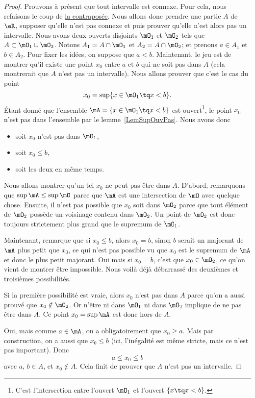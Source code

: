 \begin{proof}
    Prouvons à présent que tout intervalle est connexe. Pour cela, nous refaisons le coup de \href{http://fr.wikipedia.org/wiki/Contraposée}{la contraposée}. Nous allons donc prendre une partie $A$ de $\eR$, supposer qu'elle n'est pas connexe et puis prouver qu'elle n'est alors pas un intervalle. Nous avons deux ouverts disjoints $\mO_1$ et $\mO_2$ tels que $A\subset \mO_1\cup \mO_2$. Notons \( A_1 = A \cap \mO_1 \) et  \( A_2 = A \cap \mO_2 \); et prenons $a\in A_1$ et $b\in A_2$. Pour fixer les idées, on suppose que $a<b$. Maintenant, le jeu est de montrer qu'il existe une point $x_0$ entre $a$ et $b$ qui ne soit pas dans $A$ (cela montrerait que $A$ n'est pas un intervalle). Nous allons prouver que c'est le cas du point
    \[
      x_0=\sup\{ x\in\mO_1\tq x<b \}.
    \]
    Étant donné que l'ensemble $\mA=\{ x\in\mO_1\tq x<b \}$ est ouvert\footnote{C'est l'intersection entre l'ouvert $\mO_1$ et l'ouvert $\{x\tq x<b \}$.}, le point $x_0$ n'est pas dans l'ensemble par le lemme~\ref{LemSupOuvPas}. Nous avons donc
    \begin{itemize}
        \item soit $x_0$ n'est pas dans $\mO_1$,
        \item soit $x_0\leq b$,
        \item soit les deux en même temps.
    \end{itemize}
    Nous allons montrer qu'un tel $x_0$ ne peut pas être dans $A$. D'abord, remarquons que $\sup\mA\leq\sup\mO$ parce que $\mA$ est une intersection de $\mO$ avec quelque chose. Ensuite, il n'est pas possible que $x_0$ soit dans $\mO_2$ parce que tout élément de $\mO_2$ possède un voisinage contenu dans $\mO_2$. Un point de $\mO_2$ est donc toujours strictement plus grand que le supremum de $\mO_1$.

    Maintenant, remarque que si $x_0\leq b$, alors $x_0=b$, sinon $b$ serait un majorant de $\mA$ plus petit que $x_0$, ce qui n'est pas possible vu que $x_0$ est le supremum de $\mA$ et donc le plus petit majorant. Oui mais si $x_0=b$, c'est que $x_0\in\mO_2$, ce qu'on vient de montrer être impossible. Nous voilà déjà débarrassé des deuxièmes et troisièmes possibilités.

    Si la première possibilité est vraie, alors $x_0$ n'est pas dans $A$ parce qu'on a aussi prouvé que $x_0\notin\mO_2$. Or n'être ni dans $\mO_1$ ni dans $\mO_2$ implique de ne pas être dans $A$. Ce point $x_0=\sup\mA$ est donc hors de $A$.

    Oui, mais comme $a\in\mA$, on a obligatoirement que $x_0\geq a$. Mais par construction, on a aussi que $x_0\leq b$ (ici, l'inégalité est même stricte, mais ce n'est pas important). Donc
    \[
      a\leq x_0\leq b
    \]
    avec $a$, $b\in A$, et $x_0\notin A$. Cela finit de prouver que $A$ n'est pas un intervalle.
\end{proof}

